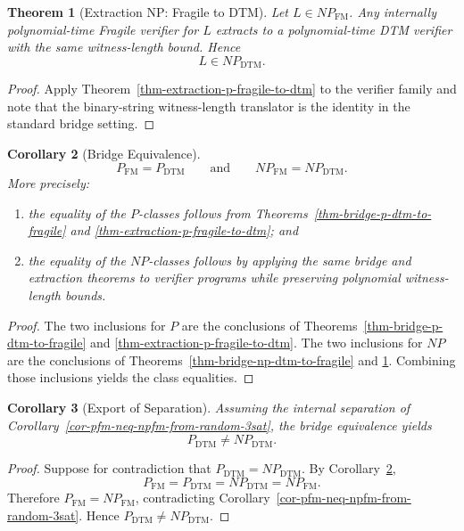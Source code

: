\documentclass[11pt]{article}
\newtheorem{theorem}{Theorem}[section]
\newtheorem{corollary}[theorem]{Corollary}
\theoremstyle{definition}
\theoremstyle{remark}
\newcommand{\PFM}{P_{\mathrm{FM}}}
\newcommand{\NPFM}{NP_{\mathrm{FM}}}
\newcommand{\PDTM}{P_{\mathrm{DTM}}}
\newcommand{\NPDTM}{NP_{\mathrm{DTM}}}
\begin{document}
\begin{theorem}[Extraction NP: Fragile to DTM]\label{thm-extraction-np-fragile-to-dtm}
Let $L \in \NPFM$. Any internally polynomial-time Fragile verifier for $L$ extracts to a polynomial-time DTM verifier with the same witness-length bound. Hence
\[
L \in \NPDTM.
\]
\end{theorem}

\begin{proof}
Apply Theorem~\ref{thm-extraction-p-fragile-to-dtm} to the verifier family and note that the binary-string witness-length translator is the identity in the standard bridge setting.
\end{proof}

\begin{corollary}[Bridge Equivalence]\label{cor-bridge-equivalence-rigorous}
\[
\PFM = \PDTM
\qquad\text{and}\qquad
\NPFM = \NPDTM.
\]
More precisely:
\begin{enumerate}
\item the equality of the $P$-classes follows from Theorems~\ref{thm-bridge-p-dtm-to-fragile} and \ref{thm-extraction-p-fragile-to-dtm}; and
\item the equality of the $NP$-classes follows by applying the same bridge and extraction theorems to verifier programs while preserving polynomial witness-length bounds.
\end{enumerate}
\end{corollary}

\begin{proof}
The two inclusions for $P$ are the conclusions of Theorems~\ref{thm-bridge-p-dtm-to-fragile} and \ref{thm-extraction-p-fragile-to-dtm}. The two inclusions for $NP$ are the conclusions of Theorems~\ref{thm-bridge-np-dtm-to-fragile} and \ref{thm-extraction-np-fragile-to-dtm}. Combining those inclusions yields the class equalities.
\end{proof}

\begin{corollary}[Export of Separation]\label{cor-export-separation}
Assuming the internal separation of Corollary~\ref{cor-pfm-neq-npfm-from-random-3sat}, the bridge equivalence yields
\[
\PDTM \neq \NPDTM.
\]
\end{corollary}

\begin{proof}
Suppose for contradiction that $\PDTM = \NPDTM$. By Corollary~\ref{cor-bridge-equivalence-rigorous},
\[
\PFM = \PDTM = \NPDTM = \NPFM.
\]
Therefore $\PFM = \NPFM$, contradicting Corollary~\ref{cor-pfm-neq-npfm-from-random-3sat}. Hence $\PDTM \neq \NPDTM$.
\end{proof}


\end{document}
